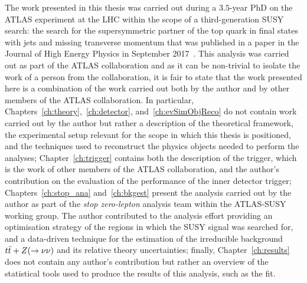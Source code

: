 The work presented in this thesis was carried out during a $3.5$-year PhD on the \acs{ATLAS} experiment at the \ac{LHC} within the scope of a third-generation \ac{SUSY} search: the search for the supersymmetric partner of the top quark in final states with jets and missing transverse momentum that was published in a paper in the Journal of High Energy Physics in September 2017~\cite{stop0L}. This analysis was carried out as part of the \ac{ATLAS} collaboration and as it can be non-trivial to isolate the work of a person from the collaboration, it is fair to state that the work presented here is a combination of the work carried out both by the author and by other members of the \ac{ATLAS} collaboration. In particular, Chapters~\ref{ch:theory},~\ref{ch:detector}, and~\ref{ch:evSimObjReco} do not contain work carried out by the author but rather a description of the theoretical framework, the experimental setup relevant for the scope in which this thesis is positioned, and the techniques used to reconstruct the physics objects needed to perform the analyses; Chapter~\ref{ch:trigger} contains both the description of the trigger, which is the work of other members of the \ac{ATLAS} collaboration, and the author’s contribution on the evaluation of the performance of the inner detector trigger; Chapters~\ref{ch:stop_ana} and~\ref{ch:bkgest} present the analysis carried out by the author as part of the \emph{stop zero-lepton} analysis team within the \ac{ATLAS}-SUSY working group. The author contributed to the analysis effort providing an optimisation strategy of the regions in which the \ac{SUSY} signal was searched for, and a data-driven technique for the estimation of the irreducible background $t\bar{t}+Z (\rightarrow \nu \nu)$ and its relative theory uncertainties; finally, Chapter~\ref{ch:results} does not contain any author's contribution but rather an overview of the statistical tools used to produce the results of this analysis, such as the fit.